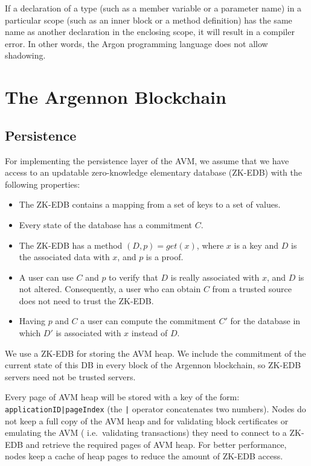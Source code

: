 \documentclass[11pt, a4paper]{report}
\begin{document}
    If a declaration of a type (such as a member variable or a parameter name) in a particular scope (such as an
    inner block or a method definition) has the same name as another declaration in the enclosing scope, it will
    result in a compiler error. In other words, the Argon programming language does not allow shadowing.


    \chapter{The Argennon Blockchain}\label{ch:argennon-blockchain}


    \section{Persistence}\label{sec:persistence}

    For implementing the persistence layer of the AVM, we assume that we have access to an updatable zero-knowledge
    elementary database (ZK-EDB) with the following properties:

    \begin{itemize}
        \item The ZK-EDB contains a mapping from a set of keys to a set of values.
        \item Every state of the database has a commitment \(C\).
        \item The ZK-EDB has a method \((D, p) = get(x)\), where \(x\) is a key and \(D\) is the associated data
        with \(x\), and \(p\) is a proof.
        \item A user can use \(C\) and \(p\) to verify that \(D\) is really associated with \(x\), and \(D\) is not
        altered. Consequently, a user who can obtain \(C\) from a trusted source does not need to trust the ZK-EDB\@.
        \item Having \(p\) and \(C\) a user can compute the commitment \(C'\) for the database in which \(D'\) is
        associated with \(x\) instead of \(D\).
    \end{itemize}

    We use a ZK-EDB for storing the AVM heap. We include the commitment of the current state of this DB in every
    block of the Argennon blockchain, so ZK-EDB servers need not be trusted servers.

    Every page of AVM heap will be stored with a key of the form: \texttt{applicationID|pageIndex} (the \texttt{|}
    operator concatenates two numbers). Nodes do not keep a full copy of the AVM heap and for validating block
    certificates or emulating the AVM ( i.e.~validating transactions) they need to connect to a ZK-EDB and retrieve
    the required pages of AVM heap. For better performance, nodes keep a cache of heap pages to
    reduce the amount of ZK-EDB access.
\end{document}
